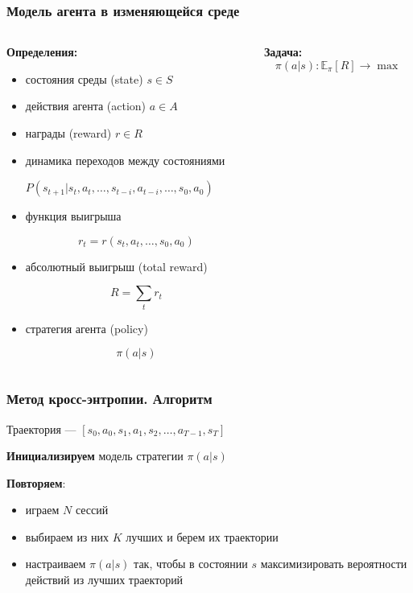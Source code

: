 \documentclass[fullscreen=true, bookmarks=true, hyperref={pdfencoding=unicode}]{beamer}
\begin{document}
\begin{frame}
  \frametitle{Модель агента в изменяющейся среде}

  \begin{columns}
    \begin{column}{.6\paperwidth}
      {\bf Определения:}
      \begin{itemize}
        \item состояния среды (state) $s \in S$
        \item действия агента (action) $a \in A$
        \item награды (reward) $r \in R$
        \item динамика переходов между состояниями

         $ P(s_{t+1} | s_t, a_t, \dots, s_{t-i}, a_{t-i}, \dots, s_0, a_0) $
        \item функция выигрыша

         $$ r_{t} = r(s_t, a_t, \dots, s_0, a_0)$$
        \item абсолютный выигрыш (total reward)

         $$ R = \sum\limits_t r_t $$
        \item стратегия агента (policy)

         $$ \pi (a | s) $$
      \end{itemize}
    \end{column}
    \begin{column}{.3\paperwidth}
      {\bf Задача:}
      $$ \pi (a | s): \mathbb{E}_\pi [R] \to \max $$
    \end{column}
  \end{columns}

\end{frame}


\begin{frame}
  \frametitle{Метод кросс-энтропии. Алгоритм}

  Траектория — $\left[s_0, a_0, s_1, a_1, s_2, \dots , a_{T-1}, s_T \right]$

  \vspace{1cm}
  {\bf Инициализируем} модель стратегии $\pi(a | s)$

  \vspace{1cm}
  {\bf Повторяем}:
  \begin{itemize}
    \item играем $N$ сессий
    \item выбираем из них $K$ лучших и берем их траектории
    \item настраиваем $\pi(a | s)$ так, чтобы в состоянии $s$ максимизировать вероятности действий из лучших траекторий
  \end{itemize}

\end{frame}
\end{document}
